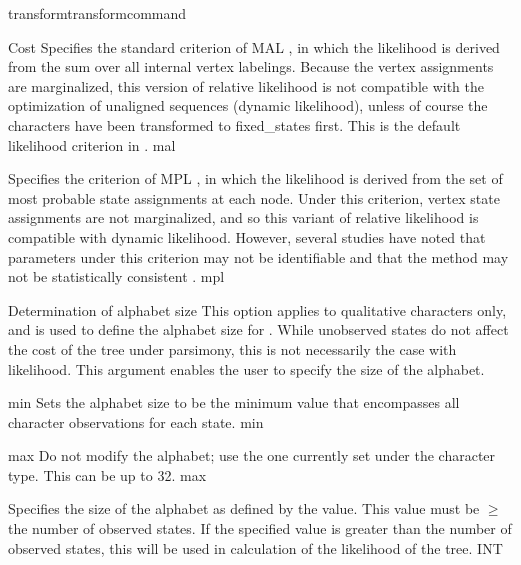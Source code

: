 \begin{command}{transform}{transformcommand}
\begin{arguments}
\begin {argumentgroup} {Cost}
{Specifies the standard criterion of MAL \cite{felsenstein1981}, in which the
likelihood is derived from the sum over all internal
vertex labelings. Because the vertex assignments are
marginalized, this version of relative likelihood is not
compatible with the optimization of unaligned sequences (dynamic likelihood), 
unless of course the characters have been transformed to \poyargument
{fixed\_states} first. This is the default likelihood criterion in \poy.}
{mal}

{Specifies the criterion of MPL \cite{barryandhartigan1987}, in which the likelihood is
derived from the set of most probable state assignments
at each node. Under this criterion, vertex state
assignments are not marginalized, and so this variant of
relative likelihood is compatible with dynamic
likelihood. However, several studies have noted that
parameters under this criterion may not be identifiable
\cite{zou2011} and that the method may not be statistically consistent
\cite{mossel2009shrinkage}.}
{mpl}

\end{argumentgroup}


\begin{argumentgroup}{Determination of alphabet size}
This option applies to qualitative characters only, and is used to
define the alphabet size for . While unobserved 
states do not affect the cost of the tree under parsimony, this is not 
necessarily the case with likelihood. 
This argument enables the user to specify the size of the alphabet.

 {\obligatory min}
{Sets the alphabet size to be the minimum value that
encompasses all character observations for each state.}
{min}

 {\obligatory max}
{Do not modify the alphabet; use the one currently
set under the character type. This can be up to 32.}%
{max}

 {\obligatory{\poyint}}
{Specifies the size of the alphabet as defined by the \poyint value. 
This value must be $ \geq $ the number of observed states.
If the specified value is greater than the number of observed states, 
this \poyint will be used in calculation of the likelihood of the tree.}
{INT}


\end{argumentgroup}
\end{arguments}
\end{command}
